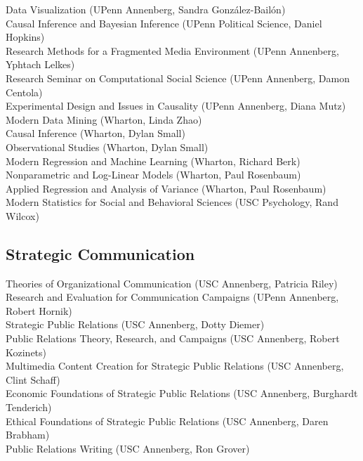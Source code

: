\documentclass[12pt, letterpaper]{article}
\newcommand{\years}[1]{\marginnote{\normalsize #1}}
\begin{document}
{  \years{} Data Visualization (UPenn Annenberg, Sandra González-Bailón)\\
  \years{} Causal Inference and Bayesian Inference (UPenn Political Science, Daniel Hopkins)\\
  \years{} Research Methods for a Fragmented Media Environment (UPenn Annenberg, Yphtach Lelkes)\\
  \years{} Research Seminar on Computational Social Science (UPenn Annenberg, Damon Centola)\\
  \years{} Experimental Design and Issues in Causality (UPenn Annenberg, Diana Mutz)\\
  \years{} Modern Data Mining (Wharton, Linda Zhao)\\
  \years{} Causal Inference (Wharton, Dylan Small)\\
  \years{} Observational Studies (Wharton, Dylan Small)\\
  \years{} Modern Regression and Machine Learning (Wharton, Richard Berk)\\
  \years{} Nonparametric and Log-Linear Models (Wharton, Paul Rosenbaum)\\
  \years{} Applied Regression and Analysis of Variance (Wharton, Paul Rosenbaum)\\
  \years{} Modern Statistics for Social and Behavioral Sciences (USC Psychology, Rand Wilcox)

\subsection*{Strategic Communication}

  \years{} Theories of Organizational Communication (USC Annenberg, Patricia Riley)\\
  \years{} Research and Evaluation for Communication Campaigns (UPenn Annenberg, Robert Hornik)\\
  \years{} Strategic Public Relations (USC Annenberg, Dotty Diemer)\\
  \years{} Public Relations Theory, Research, and Campaigns (USC Annenberg, Robert Kozinets)\\
  \years{} Multimedia Content Creation for Strategic Public Relations (USC Annenberg, Clint Schaff)\\
  \years{} Economic Foundations of Strategic Public Relations (USC Annenberg, Burghardt Tenderich)\\
  \years{} Ethical Foundations of Strategic Public Relations (USC Annenberg, Daren Brabham)\\
  \years{} Public Relations Writing (USC Annenberg, Ron Grover)

}
\end{document}
